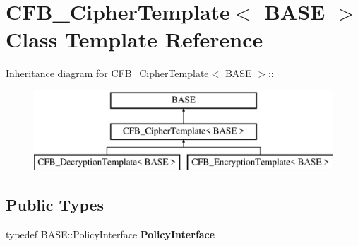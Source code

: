 \hypertarget{class_c_f_b___cipher_template}{
\section{CFB\_\-CipherTemplate$<$ BASE $>$ Class Template Reference}
\label{class_c_f_b___cipher_template}
}
Inheritance diagram for CFB\_\-CipherTemplate$<$ BASE $>$::\begin{figure}[H]
\begin{center}
\leavevmode
\includegraphics[height=3cm]{class_c_f_b___cipher_template}
\end{center}
\end{figure}
\subsection*{Public Types}
\begin{DoxyCompactItemize}
\item 
\hypertarget{class_c_f_b___cipher_template_a9e72e3524dd351fd0e87382fe84cd306}{
typedef BASE::PolicyInterface {\bfseries PolicyInterface}}
\label{class_c_f_b___cipher_template_a9e72e3524dd351fd0e87382fe84cd306}

\end{DoxyCompactItemize}
